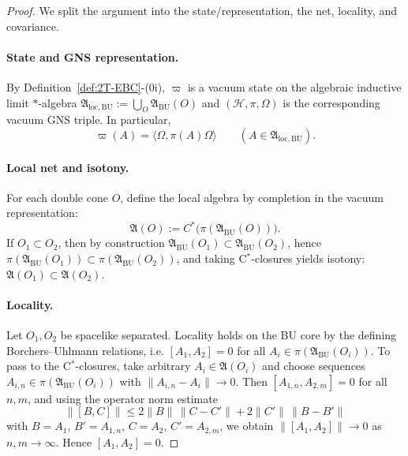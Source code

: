 \begin{proof}
We split the argument into the state/representation, the net, locality, and
covariance.

\paragraph{State and GNS representation.}
By Definition~\ref{def:2T-EBC}-(0i), $\varpi$ is a vacuum state on the algebraic
inductive limit $*$-algebra
$
\mathfrak A_{\mathrm{loc,BU}}:=\bigcup_O \mathfrak A_{\mathrm{BU}}(O)
$
and $(\mathcal H,\pi,\Omega)$ is the corresponding vacuum GNS triple. In
particular,
\[
\varpi(A)=\langle\Omega,\pi(A)\Omega\rangle
\qquad(A\in\mathfrak A_{\mathrm{loc,BU}}).
\]

\paragraph{Local net and isotony.}
For each double cone $O$, define the local algebra by completion in the vacuum
representation:
\[
\mathfrak A(O):=C^*\!\big(\pi(\mathfrak A_{\mathrm{BU}}(O))\big).
\]
If $O_1\subset O_2$, then by construction
$\mathfrak A_{\mathrm{BU}}(O_1)\subset\mathfrak A_{\mathrm{BU}}(O_2)$, hence
$\pi(\mathfrak A_{\mathrm{BU}}(O_1))\subset\pi(\mathfrak A_{\mathrm{BU}}(O_2))$,
and taking C$^*$-closures yields isotony:
$\mathfrak A(O_1)\subset\mathfrak A(O_2)$.

\paragraph{Locality.}
Let $O_1,O_2$ be spacelike separated. Locality holds on the BU core by the
defining Borchers--Uhlmann relations, i.e.
$[A_1,A_2]=0$ for all
$A_i\in \pi(\mathfrak A_{\mathrm{BU}}(O_i))$.
To pass to the C$^*$-closures, take arbitrary $A_i\in\mathfrak A(O_i)$ and
choose sequences $A_{i,n}\in\pi(\mathfrak A_{\mathrm{BU}}(O_i))$ with
$\|A_{i,n}-A_i\|\to 0$.
Then $[A_{1,n},A_{2,m}]=0$ for all $n,m$, and using the operator norm estimate
\[
\|[B,C]\|\le 2\|B\|\,\|C-C'\|+2\|C'\|\,\|B-B'\|
\]
with $B=A_1$, $B'=A_{1,n}$, $C=A_2$, $C'=A_{2,m}$, we obtain
$\|[A_1,A_2]\|\to 0$ as $n,m\to\infty$. Hence $[A_1,A_2]=0$.


\end{proof}
